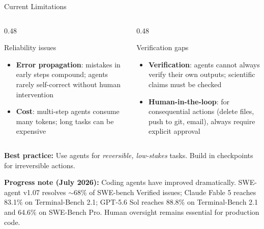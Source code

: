 \begin{frame}{Current Limitations}
  \begin{columns}[T, onlytextwidth]
    \begin{column}{0.48\textwidth}
      \begin{alertblock}{Reliability issues}
        \begin{itemize}
          \item \textbf{Error propagation}: mistakes in early steps compound; agents rarely self-correct without human intervention
          \item \textbf{Cost}: multi-step agents consume many tokens; long tasks can be expensive
        \end{itemize}
      \end{alertblock}
    \end{column}
    \hfill
    \begin{column}{0.48\textwidth}
      \begin{alertblock}{Verification gaps}
        \begin{itemize}
          \item \textbf{Verification}: agents cannot always verify their own outputs; scientific claims must be checked
          \item \textbf{Human-in-the-loop}: for consequential actions (delete files, push to git, email), always require explicit approval
        \end{itemize}
      \end{alertblock}
    \end{column}
  \end{columns}
  \vspace{0.6em}
  \textbf{Best practice:} Use agents for \emph{reversible, low-stakes} tasks. Build in checkpoints for irreversible actions.
  \vspace{0.4em}

  \textbf{Progress note (July 2026):} Coding agents have improved dramatically. SWE-agent v1.07 resolves $\sim$68\% of SWE-bench Verified issues; Claude Fable 5 reaches 83.1\% on Terminal-Bench 2.1; GPT-5.6 Sol reaches 88.8\% on Terminal-Bench 2.1 and 64.6\% on SWE-Bench Pro. Human oversight remains essential for production code.
\end{frame}


